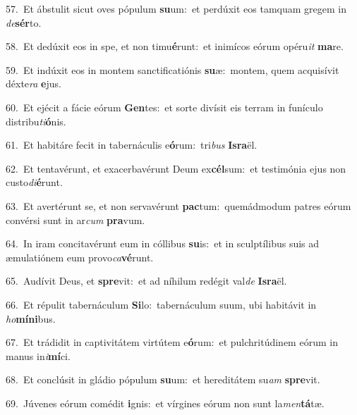 {\numbfont\textcolor{\numbcolor}{57.}}~Et ábstulit sicut oves pópulum \textbf{su}\-um:~\star et perdúxit eos tamquam gregem in \textit{de}\-\textbf{sér}to.\par
{\numbfont\textcolor{\numbcolor}{58.}}~Et dedúxit eos in spe, et non timu\-\textbf{é}\-runt:~\star et inimícos eórum opéru\textit{it} \textbf{ma}\-re.\par
{\numbfont\textcolor{\numbcolor}{59.}}~Et indúxit eos in montem sanctificatiónis \textbf{su}\-æ:~\star montem, quem acquisívit déxte\textit{ra} \textbf{e}\-jus.\par
{\numbfont\textcolor{\numbcolor}{60.}}~Et ejécit a fácie eórum \textbf{Gen}\-tes:~\star et sorte divísit eis terram in funículo distribu\-\textit{ti}\-\textbf{ó}nis.\par
{\numbfont\textcolor{\numbcolor}{61.}}~Et habitáre fecit in tabernáculis e\-\textbf{ó}\-rum:~\star tri\textit{bus} \textbf{Is}\-\textbf{ra}ël.\par
{\numbfont\textcolor{\numbcolor}{62.}}~Et tentavérunt, et exacerbavérunt Deum ex\-\textbf{cél}\-sum:~\star et testimónia ejus non custo\-\textit{di}\-\textbf{é}runt.\par
{\numbfont\textcolor{\numbcolor}{63.}}~Et avertérunt se, et non servavérunt \textbf{pac}\-tum:~\star quemádmodum patres eórum convérsi sunt in ar\textit{cum} \textbf{pra}\-vum.\par
{\numbfont\textcolor{\numbcolor}{64.}}~In iram concitavérunt eum in cóllibus \textbf{su}\-is:~\star et in sculptílibus suis ad æmulatiónem eum provo\-\textit{ca}\-\textbf{vé}runt.\par
{\numbfont\textcolor{\numbcolor}{65.}}~Audívit Deus, et \textbf{spre}\-vit:~\star et ad níhilum redégit val\textit{de} \textbf{Is}\-\textbf{ra}ël.\par
{\numbfont\textcolor{\numbcolor}{66.}}~Et répulit tabernáculum \textbf{Si}\-lo:~\star tabernáculum suum, ubi habitávit in \textit{ho}\-\textbf{mí}\textbf{ni}bus.\par
{\numbfont\textcolor{\numbcolor}{67.}}~Et trádidit in captivitátem virtútem e\-\textbf{ó}\-rum:~\star et pulchritúdinem eórum in manus in\-\textit{i}\-\textbf{mí}ci.\par
{\numbfont\textcolor{\numbcolor}{68.}}~Et conclúsit in gládio pópulum \textbf{su}\-um:~\star et hereditátem su\textit{am} \textbf{spre}\-vit.\par
{\numbfont\textcolor{\numbcolor}{69.}}~Júvenes eórum comédit \textbf{i}\-gnis:~\star et vírgines eórum non sunt la\-\textit{men}\-\textbf{tá}tæ.\par

